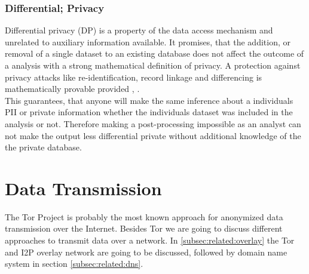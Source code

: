         \subsubsection{Differential; Privacy}
            \label{subsec:related:dif_privacy}
            Differential privacy (DP) is a property of the data access mechanism and unrelated to auxiliary information available\cite{dwork_algorithmic_2013}. 
            It promises, that the addition, or removal of a single dataset to an existing database does not affect the outcome of a analysis with a strong mathematical definition of privacy. A protection against privacy attacks like re-identification, record linkage and differencing is mathematically provable provided \cite{agrawal_differential_2008}, \cite{wood_differential_2018}. \\
            This guarantees, that anyone will make the same inference about a individuals PII or private information whether the individuals dataset was included in the analysis or not\cite{wood_differential_2018}. Therefore making a post-processing impossible as an analyst can not make the output less differential private without additional knowledge of the the private database\cite{nguyen_understanding_2019}.
            
\section{Data Transmission}
    \label{sec:related:data_transmission}
    The Tor Project is probably the most known approach for anonymized data transmission over the Internet. Besides Tor we are going to discuss different approaches to transmit data over a network. In \ref{subsec:related:overlay} the Tor and I2P overlay network are going to be discussed, followed by domain name system in section \ref{subsec:related:dns}. 
        
        

